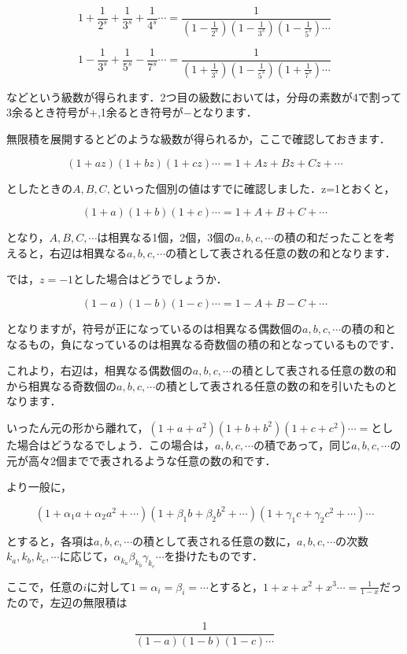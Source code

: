 \documentclass[./main]{subfiles}
\theoremstyle{break}
\begin{document}
\[1+\frac{1}{2^s}+\frac{1}{3^s}+\frac{1}{4^s}\cdots =\frac{1}{\left( 1-\frac{1}{2^s} \right)\left( 1-\frac{1}{3^s} \right)\left( 1-\frac{1}{5^s} \right)\cdots}\]

\[1-\frac{1}{3^s}+\frac{1}{5^s}-\frac{1}{7^s}\cdots =\frac{1}{\left( 1+\frac{1}{3^s} \right)\left( 1-\frac{1}{5^s} \right)\left( 1+\frac{1}{7^s} \right)\cdots}\]

などという級数が得られます．2つ目の級数においては，分母の素数が4で割って3余るとき符号が$+$,1余るとき符号が$-$となります．

無限積を展開するとどのような級数が得られるか，ここで確認しておきます．

\[(1+az)(1+bz)(1+cz)\cdots=1+Az+Bz+Cz+\cdots\]

としたときの$A,B,C,$といった個別の値はすでに確認しました．z=1とおくと，

\[(1+a)(1+b)(1+c)\cdots=1+A+B+C+\cdots\]

となり，$A,B,C,\cdots$は相異なる1個，2個，3個の$a,b,c,\cdots$の積の和だったことを考えると，右辺は相異なる$a,b,c,\cdots$の積として表される任意の数の和となります．

では，$z=-1$とした場合はどうでしょうか．

\[(1-a)(1-b)(1-c)\cdots=1-A+B-C+\cdots\]

となりますが，符号が正になっているのは相異なる偶数個の$a,b,c,\cdots$の積の和となるもの，負になっているのは相異なる奇数個の積の和となっているものです．

これより，右辺は，相異なる偶数個の$a,b,c,\cdots$の積として表される任意の数の和から相異なる奇数個の$a,b,c,\cdots$の積として表される任意の数の和を引いたものとなります．

いったん元の形から離れて，$(1+a+a^2)(1+b+b^2)(1+c+c^2)\cdots=$とした場合はどうなるでしょう．この場合は，$a,b,c,\cdots$の積であって，同じ$a,b,c,\cdots$の元が高々2個までで表されるような任意の数の和です．

より一般に，

\[(1+\alpha_1a+\alpha_2a^2+\cdots)(1+\beta_1b+\beta_2b^2+\cdots)(1+\gamma_1c+\gamma_2c^2+\cdots)\cdots\]

とすると，各項は$a,b,c,\cdots$の積として表される任意の数に，$a,b,c,\cdots$の次数$k_a,k_b,k_c,\cdots$に応じて，$\alpha_{k_a}\beta_{k_b}\gamma_{k_c}\cdots$を掛けたものです．

ここで，任意の$i$に対して$1=\alpha_i=\beta_i=\cdots$とすると，$1+x+x^2+x^3\cdots=\frac{1}{1-x}$だったので，左辺の無限積は

\[\frac{1}{(1-a)(1-b)(1-c)\cdots}\]
\end{document}
